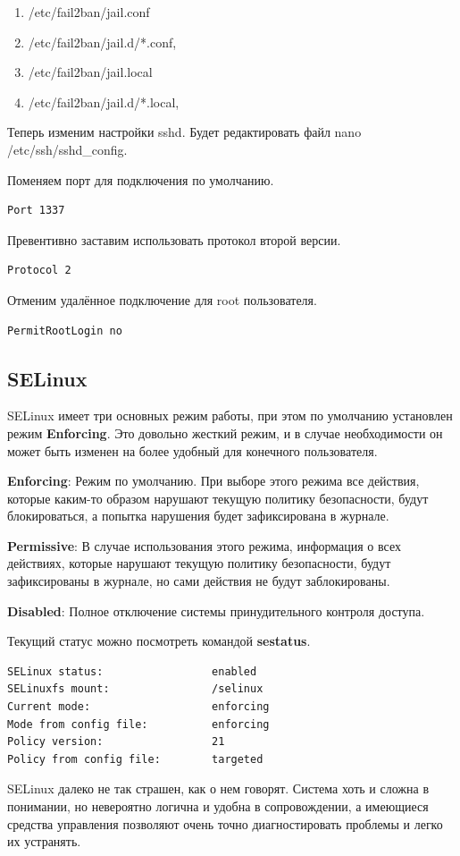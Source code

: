\begin{enumerate}
	\item /etc/fail2ban/jail.conf
	\item 	/etc/fail2ban/jail.d/*.conf,
	\item 	/etc/fail2ban/jail.local
	\item 	/etc/fail2ban/jail.d/*.local,
\end{enumerate}

Теперь изменим настройки sshd. Будет редактировать файл nano /etc/ssh/sshd\_config.

Поменяем порт для подключения по умолчанию.

\begin{lstlisting}
Port 1337
\end{lstlisting}

Превентивно заставим использовать протокол второй версии.

\begin{lstlisting}
Protocol 2
\end{lstlisting}

Отменим удалённое подключение для root пользователя.

\begin{lstlisting}
PermitRootLogin no
\end{lstlisting}

\subsection{SELinux}

SELinux имеет три основных режим работы, при этом по умолчанию установлен режим
\textbf{Enforcing}. Это довольно жесткий режим, и в случае необходимости он может быть изменен на более удобный для конечного пользователя.

\textbf{Enforcing}: Режим по умолчанию. При выборе этого режима все действия, которые каким-то образом нарушают текущую политику безопасности, будут блокироваться, а попытка нарушения будет зафиксирована в журнале.

\textbf{Permissive}: В случае использования этого режима, информация о всех действиях, которые нарушают текущую политику безопасности, будут зафиксированы в журнале, но сами действия не будут заблокированы.

\textbf{Disabled}: Полное отключение системы принудительного контроля доступа.

Текущий статус можно посмотреть командой \textbf{sestatus}.

\begin{lstlisting}
SELinux status:                 enabled
SELinuxfs mount:                /selinux
Current mode:                   enforcing
Mode from config file:          enforcing
Policy version:                 21
Policy from config file:        targeted
\end{lstlisting}

SELinux далеко не так страшен, как о нем говорят. Система хоть и сложна в понимании, но невероятно логична и удобна в сопровождении, а имеющиеся средства управления позволяют очень точно диагностировать проблемы и легко их устранять.


